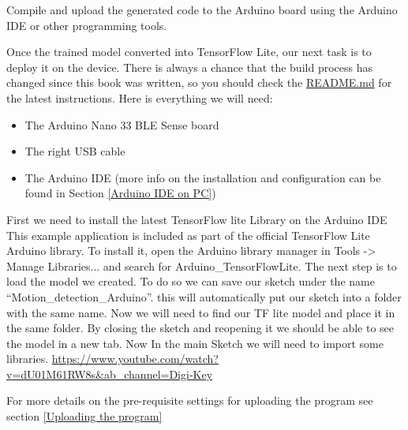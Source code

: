 Compile and upload the generated code to the Arduino board using the Arduino IDE or other programming tools.



Once the trained model converted into TensorFlow Lite, our next task is to deploy it on the device. There is always a chance that the build process has changed since this book was written, so you should check the  \href{https://github.com/tensorflow/tensorflow/blob/be4f6874533d78f662d9777b66abe3cdde98f901/tensorflow/lite/experimental/micro/examples/hello_world/README.md}{README.md}  for the latest instructions.
Here is everything we will need:
\begin{itemize}
\item The Arduino Nano 33 BLE Sense board
\item The right USB cable
\item The Arduino IDE (more info on the installation and configuration can be found in Section \ref{Arduino IDE on PC})
\end{itemize}


First we need to install the latest TensorFlow lite Library on the Arduino IDE 
This example application is included as part of the official TensorFlow Lite Arduino library. To install it, open the Arduino library manager in Tools -> Manage Libraries... and search for Arduino\_TensorFlowLite.
The next step is to load the model we created. To do so we can save our sketch under the name “Motion\_detection\_Arduino”. this will automatically put our sketch into a folder with the same name. 
Now we will need to find our TF lite model and place it in the same folder.
By closing the sketch and reopening it we should be able to see the model in a new tab. 
Now In the main Sketch we will need to import some libraries. 
\url{https://www.youtube.com/watch?v=dU01M61RW8s&ab_channel=Digi-Key}


For more details on the pre-requisite settings for uploading the program see section \ref{Uploading the program} 


